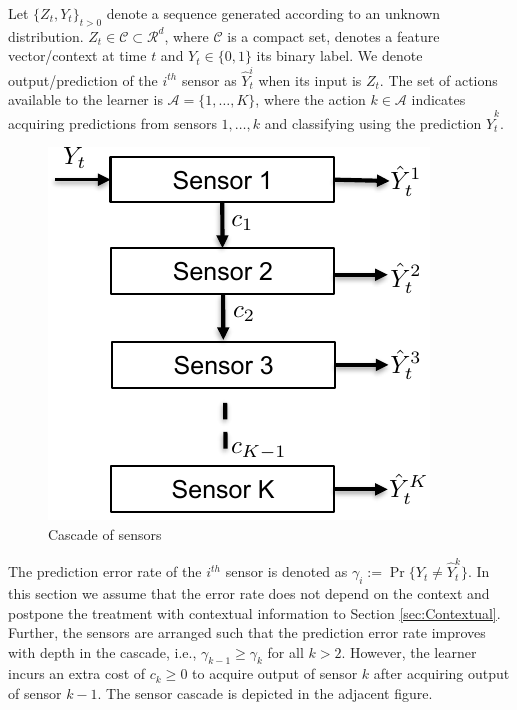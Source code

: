 \documentclass{article}
\begin{document}
Let $\{Z_t, Y_t\}_{{t>0}}$ denote a sequence generated according to an unknown distribution. $Z_t \in\mathcal{C} \subset  \mathcal{R}^d$, where $\mathcal{C}$ is a compact set, denotes a feature vector/context at time $t$ and $Y_t \in \{0,1\}$ its binary label. We denote output/prediction of the $i^{th}$ sensor as $\hat{Y}^i_t$ when its input is $Z_t$. The set of actions available to the learner is $\mathcal{A}=\{1,\ldots, K\}$, where  the action $k \in \mathcal{A}$ indicates acquiring predictions from sensors $1,\ldots, k$ and classifying using the prediction $\hat{Y}^k_t$. 


\begin{figure}
	\vspace{-.5cm}
	\centering
	\includegraphics[scale=.6]{SensorCascade.pdf}
	\caption{Cascade of sensors}\label{wrap-fig:1}
    \vspace{-.5cm}
\end{figure} 

The prediction error rate of the $i^{th}$ sensor is denoted as $\gamma_i:=\Pr\{Y_t\neq \hat{Y}^k_t\}$. In this section we assume that the error rate does not depend on the  context and postpone the treatment with contextual information to Section \ref{sec:Contextual}. Further, the sensors are arranged such that the prediction error rate improves with depth in the cascade, i.e., $\gamma_{k-1}\geq \gamma_k$ for all $k>2$. However, the learner incurs an extra cost of $c_k\geq 0$ to acquire output of sensor $k$ after acquiring output of sensor $k-1$. The sensor cascade is depicted in the adjacent figure.
\end{document}
